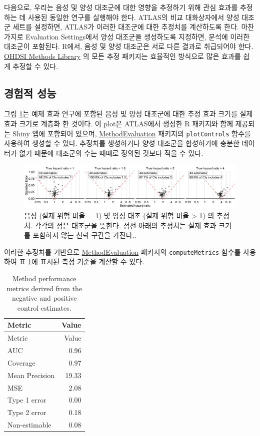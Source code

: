 \documentclass[10.5pt]{book}
\theoremstyle{definition}
\theoremstyle{definition}
\theoremstyle{definition}
\theoremstyle{remark}
\begin{document}
다음으로, 우리는 음성 및 양성 대조군에 대한 영향을 추정하기 위해 관심
효과를 추정하는 데 사용된 동일한 연구를 실행해야 한다. ATLAS의 비교
대화상자에서 양성 대조군 세트를 설정하면, ATLAS가 이러한 대조군에 대한
추정치를 계산하도록 한다. 마찬가지로 Evaluation Settings에서 양성
대조군을 생성하도록 지정하면, 분석에 이러한 대조군이 포함된다. R에서,
음성 및 양성 대조군은 서로 다른 결과로 취급되어야 한다.
\href{https://ohdsi.github.io/MethodsLibrary/}{OHDSI Methods Library} 의
모든 추정 패키지는 효율적인 방식으로 많은 효과를 쉽게 추정할 수 있다.

\subsection{경험적 성능}\label{-}

그림 \ref{fig:controls}는 예제 효과 연구에 포함된 음성 및 양성 대조군에
대한 추정 효과 크기를 실제 효과 크기로 계층화 한 것이다. 이 plot은
ATLAS에서 생성한 R 패키지와 함께 제공되는 Shiny 앱에 포함되어 있으며,
\href{https://ohdsi.github.io/MethodEvaluation/}{MethodEvaluation}
패키지의 \texttt{plotControls} 함수를 사용하여 생성할 수 있다. 추정치를
생성하거나 양성 대조군을 합성하기에 충분한 데이터가 없기 때문에 대조군의
수는 때때로 정의된 것보다 적을 수 있다.

\begin{figure}

{\centering \includegraphics[width=1\linewidth]{images/MethodValidity/controls} 

}

\caption{음성 (실제 위험 비율 = 1) 및 양성 대조 (실제 위험 비율 > 1) 의 추정치. 각각의 점은 대조군을 뜻한다. 점선 아래의 추정치는 실제 효과 크기를 포함하지 않는 신뢰 구간을 가진다..}\label{fig:controls}
\end{figure}

이러한 추정치를 기반으로
\href{https://ohdsi.github.io/MethodEvaluation/}{MethodEvaluation}
패키지의 \texttt{computeMetrics} 함수를 사용하여 표
\ref{tab:exampleMetrics}에 표시된 측정 기준을 계산할 수 있다.

\begin{longtable}[]{@{}lr@{}}
\caption{\label{tab:exampleMetrics} Method performance metrics derived from
the negative and positive control estimates.}\tabularnewline
\toprule
Metric & Value\tabularnewline
\midrule
\endfirsthead
\toprule
Metric & Value\tabularnewline
\midrule
\endhead
AUC & 0.96\tabularnewline
Coverage & 0.97\tabularnewline
Mean Precision & 19.33\tabularnewline
MSE & 2.08\tabularnewline
Type 1 error & 0.00\tabularnewline
Type 2 error & 0.18\tabularnewline
Non-estimable & 0.08\tabularnewline
\bottomrule
\end{longtable}
\end{document}
